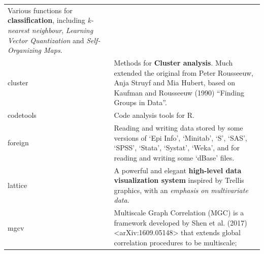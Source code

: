 \documentclass[]{book}
\theoremstyle{definition}
\theoremstyle{definition}
\theoremstyle{definition}
\theoremstyle{remark}
\begin{document}
\begin{longtable}[]{@{}ll@{}}
\begin{minipage}[t]{0.73\columnwidth}
Various functions for \textbf{classification}, including \emph{k-nearest
neighbour}, \emph{Learning Vector Quantization} and
\emph{Self-Organizing Maps}.\strut
\end{minipage}\tabularnewline
\begin{minipage}[t]{0.16\columnwidth}\raggedright\strut
cluster\strut
\end{minipage} & \begin{minipage}[t]{0.73\columnwidth}\raggedright\strut
Methods for \textbf{Cluster analysis}. Much extended the original from
Peter Rousseeuw, Anja Struyf and Mia Hubert, based on Kaufman and
Rousseeuw (1990) ``Finding Groups in Data''.\strut
\end{minipage}\tabularnewline
\begin{minipage}[t]{0.16\columnwidth}\raggedright\strut
codetools\strut
\end{minipage} & \begin{minipage}[t]{0.73\columnwidth}\raggedright\strut
Code analysis tools for R.\strut
\end{minipage}\tabularnewline
\begin{minipage}[t]{0.16\columnwidth}\raggedright\strut
foreign\strut
\end{minipage} & \begin{minipage}[t]{0.73\columnwidth}\raggedright\strut
Reading and writing data stored by some versions of `Epi Info',
`Minitab', `S', `SAS', `SPSS', `Stata', `Systat', `Weka', and for
reading and writing some `dBase' files.\strut
\end{minipage}\tabularnewline
\begin{minipage}[t]{0.16\columnwidth}\raggedright\strut
lattice\strut
\end{minipage} & \begin{minipage}[t]{0.73\columnwidth}\raggedright\strut
A powerful and elegant \textbf{high-level data visualization system}
inspired by Trellis graphics, with an \emph{emphasis on multivariate
data}.\strut
\end{minipage}\tabularnewline
\begin{minipage}[t]{0.16\columnwidth}\raggedright\strut
mgcv\strut
\end{minipage} & \begin{minipage}[t]{0.73\columnwidth}\raggedright\strut
Multiscale Graph Correlation (MGC) is a framework developed by Shen et
al. (2017) \textless{}arXiv:1609.05148\textgreater{} that extends global
correlation procedures to be multiscale;\strut
\end{minipage}\tabularnewline

\end{longtable}
\end{document}

